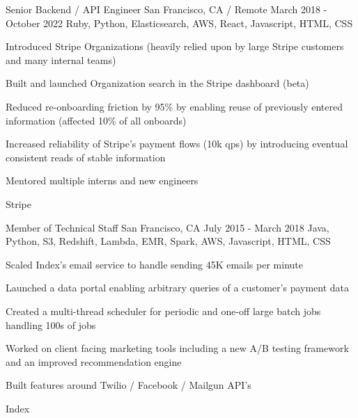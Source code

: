\documentclass[letterpaper]{simjega-resume}
\begin{document}
{Senior Backend / API Engineer}
{San Francisco, CA / Remote}
{March 2018 - October 2022}
{Ruby, Python, Elasticsearch, AWS, React, Javascript, HTML, CSS}
{\begin{tightitemize}
\item[] Introduced Stripe Organizations (heavily relied upon by large Stripe customers and many internal teams)
\item[] Built and launched Organization search in the Stripe dashboard (beta)
\item[] Reduced re-onboarding friction by 95\% by enabling reuse of previously entered information (affected 10\% of all onboards)
\item[] Increased reliability of Stripe's payment flows (10k qps) by introducing eventual consistent reads of stable information
\item[] Mentored multiple interns and new engineers
\end{tightitemize}}
{Stripe}

{Member of Technical Staff}
{San Francisco, CA}
{July 2015 - March 2018}
{Java, Python, S3, Redshift, Lambda, EMR, Spark, AWS, Javascript, HTML, CSS}
{\begin{tightitemize}
\item[] Scaled Index's email service to handle sending 45K emails per minute
\item[] Launched a data portal enabling arbitrary queries of a customer's payment data
\item[] Created a multi-thread scheduler for periodic and one-off large batch jobs handling 100s of jobs
\item[] Worked on client facing marketing tools including a new A/B testing framework and an improved recommendation engine
\item[] Built features around Twilio / Facebook / Mailgun API's
\end{tightitemize}}
{Index}
\end{document}
